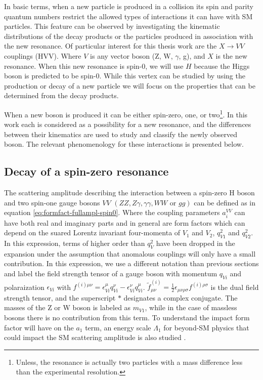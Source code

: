 In basic terms, when a new particle is produced in a collision its spin and parity quantum numbers restrict the allowed types of interactions it can have with SM particles. This feature can be observed by investigating the kinematic distributions of the decay products or the particles produced in association with the new resonance. Of particular interest for this thesis work are the $X \to VV$ couplings (HVV). Where $V$ is any vector boson (Z, W, $\gamma$, g), and $X$ is the new resonance. When this new resonance is spin-0, we will use $H$ because the Higgs boson is predicted to be spin-0. While this vertex can be studied by using the production or decay of a new particle we will focus on the properties that can be determined from the decay products. 

When a new boson is produced it can be either spin-zero, one, or two\footnote{Unless, the resonance is actually two particles with a mass difference less than the experimental resolution.}. In this work each is considered as a possibility for a new resonance, and the differences between their kinematics are used to study and classify the newly observed boson. The relevant phenomenology for these interactions is presented below.

\subsection{Decay of a spin-zero resonance}
\label{sec:Spin0_Pheno}

The scattering amplitude describing the interaction between a spin-zero H boson and two spin-one gauge bosons $VV$ $\left(ZZ, Z\gamma, \gamma\gamma, WW \text{ or } gg\right)$ can be defined as in equation \eqref{eq:formfact-fullampl-spin0}. Where the coupling parameters $a_{i}^{VV}$ can have both real and imaginary parts and in general are form factors which can depend on the suared Lorentz invariant four-momenta of $V_{1}$ and $V_{2}$, $q_{V1}^2$ and $q_{V2}^2$. In this expression, terms of higher order than $q_{V}^2$ have been dropped in the expansion under the assumption that anomalous couplings will only have a small contribution. In this expression, we use a different notation than previous sections and label the field strength tensor of a gauge boson with momentum $q_{Vi}$ and polaraization $\epsilon_{Vi}$ with $f^{\left(i\right) \mu \nu} = \epsilon^{\mu}_{Vi}q_{Vi}^{\nu} - \epsilon^{\nu}_{Vi}q_{Vi}^{\mu}$. ${\tilde f}^{\left(i\right)}_{\mu \nu} = \frac{1}{2}\epsilon_{\mu\nu\rho\sigma}f^{\left(i\right) \rho \sigma}$ is the dual field strength tensor, and the superscript $*$ designates a complex conjugate. The masses of the Z or W boson is labeled as $m_{V1}$, while in the case of massless bosons there is no contribution from this term. To understand the impact form factor will have on the $a_{1}$ term, an energy scale $\Lambda_{1}$ for beyond-SM physics that could impact the SM scattering amplitude is also studied \cite{Anderson:2013afp}. 


